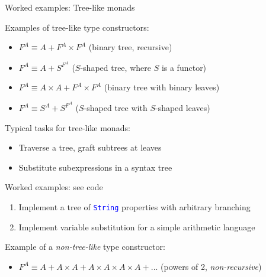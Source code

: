 \documentclass[english]{beamer}
\begin{document}
\begin{frame}{Worked examples: Tree-like monads}

Examples of tree-like type constructors:
\begin{itemize}
\item $F^{A}\equiv A+F^{A}\times F^{A}$ (binary tree, recursive)
\item $F^{A}\equiv A+S^{F^{A}}$ ($S$-shaped tree, where $S$ is a functor)
\item $F^{A}\equiv A\times A+F^{A}\times F^{A}$ (binary tree with binary
leaves)
\item $F^{A}\equiv S^{A}+S^{F^{A}}$ ($S$-shaped tree with $S$-shaped
leaves)
\end{itemize}
Typical tasks for tree-like monads:
\begin{itemize}
\item Traverse a tree, graft subtrees at leaves
\item Substitute subexpressions in a syntax tree
\end{itemize}
Worked examples: see code
\begin{enumerate}
\item Implement a tree of \texttt{\textcolor{blue}{\footnotesize{}String}}
properties with arbitrary branching
\item Implement variable substitution for a simple arithmetic language
\end{enumerate}
Example of a \emph{non-tree-like} type constructor:
\begin{itemize}
\item $F^{A}\equiv A+A\times A+A\times A\times A\times A+...$ (powers of
2, \emph{non-recursive})
\end{itemize}
\end{frame}
\end{document}
